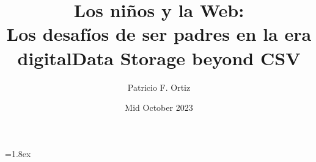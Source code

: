 \documentclass[11pt,openany]{memoir}
\title{Los ni\~nos y la Web:\\ Los desaf\'ios de ser padres en la era digital}
\title{Data Storage beyond CSV}
\author{Patricio F. Ortiz}
\date{Mid October 2023}
\begin{document}



\parskip=1.8ex

\maketitle
\newpage
\newpage




\pagebreak

\tableofcontents


\newpage


\begin{comment}
This is supposed to be a hidden text, not shown in the resulting pdf
and mot a fucking errors and that's it.
\end{comment}





\printindex
\end{document}
